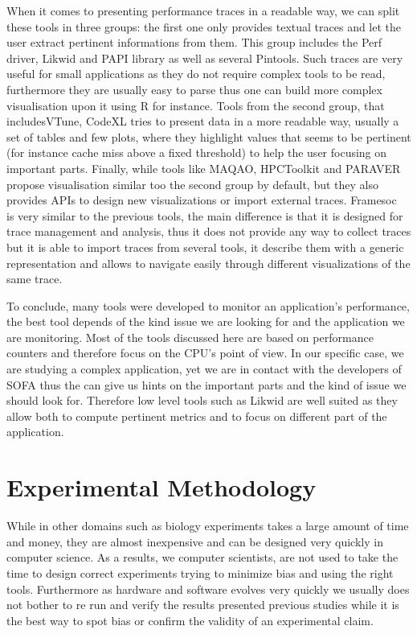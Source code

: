 When it comes to presenting performance traces in a readable way, we can split
these tools in three groups: the first one only provides textual traces and
let the user extract pertinent informations from them. This group includes
the \gls{Perf} driver, \gls{Likwid} and \gls{PAPI} library as well as several
\glspl{Pintool}. Such traces are very useful for small applications as they
do not require complex tools to be read, furthermore they are usually easy
to parse thus one can build more complex visualisation upon it using \gls{R}
for instance. Tools from the
second group, that includes\gls{VTune}, \gls{CodeXL} tries to present data in
a more readable way, usually a set of tables and few plots, where they
highlight values that seems to be pertinent (for instance cache miss above a
fixed threshold) to help the user focusing on important parts. Finally,
while tools like \gls{MAQAO}, \gls{HPCToolkit} and \gls{PARAVER} propose
visualisation similar too the second group by default, but they also provides
\glspl{API} to design new visualizations or import external traces.
\gls{Framesoc}~\cite{Pagano13Trace} is very similar to the previous tools, the
main difference is that it is designed for trace management and analysis, thus
it does not provide any way to collect traces but it is able to import traces
from several tools, it  describe them with a generic representation and allows
to navigate easily through different visualizations of the same trace.

To conclude, many tools were developed to monitor an application's
performance, the best tool depends of the kind issue we are looking for and
the application we are monitoring. Most of the tools discussed here are based
on performance counters and therefore focus on the \gls{CPU}'s point of view.
In our specific case, we are studying a complex application, yet we are in
contact with the developers of \gls{SOFA} thus the can give us hints on the
important parts and the kind of issue we should look for. Therefore low level
tools such as \gls{Likwid} are well suited as they allow both to compute
pertinent metrics and to focus on different part of the application.

\section{Experimental Methodology}
\label{sec:expe-methodo}

While in other domains such as biology experiments takes a large amount of
time and money, they are almost inexpensive and can be designed very quickly
in computer science. As a results, we computer scientists, are not used to
take the time to design correct experiments trying to minimize bias and using
the right tools. Furthermore as hardware and software evolves very quickly we
usually does not bother to re run and verify the results presented previous
studies while it is the best way to spot bias or confirm the validity of an
experimental claim.

